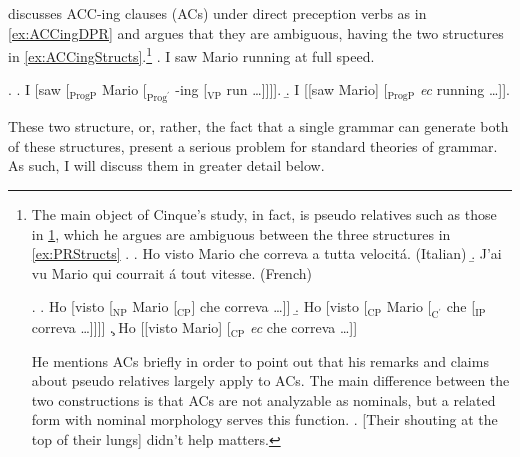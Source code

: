 \documentclass[MilwayThesis]{subfiles}
\begin{document}
\textcite{cinque1996pseudo} discusses ACC-ing clauses (ACs) under direct preception verbs as in \cref{ex:ACCingDPR} and argues that they are ambiguous, having the two structures in \cref{ex:ACCingStructs}.\footnote{
	The main object of Cinque's study, in fact, is pseudo relatives such as those in \cref{ex:PR}, which he argues are ambiguous between the three structures in \cref{ex:PRStructs}
	\ex.\label{ex:PR}
	\a. Ho visto Mario che correva a tutta velocit\'a. (Italian)
	\b. J'ai vu Mario qui courrait \'a tout vitesse. (French)

	\ex.\label{ex:PRStruct}
	\a. Ho [visto [$_\text{NP}$ Mario [$_\text{CP}$] che correva \ldots ]]
	\b. Ho [visto [$_\text{CP}$ Mario [$_{\text{C}^\prime}$ che [$_\text{IP}$ correva \ldots ]]]]
	\c. Ho [[visto Mario] [$_\text{CP}$ \textit{ec} che correva \ldots]]

	He mentions ACs briefly in order to point out that his remarks and claims about pseudo relatives largely apply to ACs.
	The main difference between the two constructions is that ACs are not analyzable as nominals, but a related form with nominal morphology serves this function.
	\ex. [Their shouting at the top of their lungs] didn't help matters.

}
\ex. I saw Mario running at full speed. \label{ex:ACCingDPR} 

\ex.\label{ex:ACCingStructs}
\a. I [saw [$_\text{ProgP}$ Mario [$_{\text{Prog}^\prime}$ -ing [$_\text{VP}$ run \ldots]]]].
\b. I [[saw Mario] [$_\text{ProgP}$ \textit{ec} running \ldots]].

These two structure, or, rather, the fact that a single grammar can generate both of these structures, present a serious problem for standard theories of grammar.
As such, I will discuss them in greater detail below.
\end{document}
